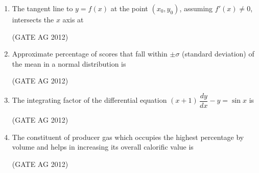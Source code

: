 \documentclass[journal]{IEEEtran}
\begin{document}
\begin{enumerate}
\medskip

\item
The tangent line to $y = f(x)$ at the point $(x_0, y_0)$, assuming $f'(x) \neq 0$, intersects the $x$ axis at
\begin{enumerate}
\end{enumerate}
\hfill(GATE AG 2012)\\

\medskip

\item
Approximate percentage of scores that fall within $\pm \sigma$ (standard deviation) of the mean in a normal distribution is 
\begin{enumerate}
\end{enumerate}
\hfill(GATE AG 2012)\\

\medskip

\item
The integrating factor of the differential equation $(x+1)\, \dfrac{dy}{dx} - y = \sin x$ is
\begin{enumerate}
\end{enumerate}
\hfill(GATE AG 2012)\\

\medskip

\item
The constituent of producer gas which occupies the highest percentage by volume and helps in increasing its overall calorific value is
\begin{enumerate}
\end{enumerate}
\hfill(GATE AG 2012)\\


\end{enumerate}
\end{document}
